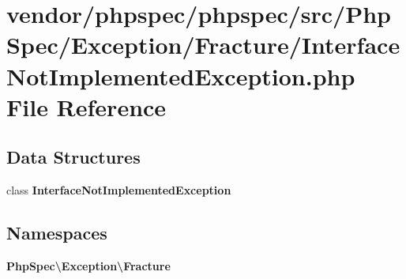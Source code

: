 \section{vendor/phpspec/phpspec/src/\+Php\+Spec/\+Exception/\+Fracture/\+Interface\+Not\+Implemented\+Exception.php File Reference}
\label{_interface_not_implemented_exception_8php}
\subsection*{Data Structures}
\begin{DoxyCompactItemize}
\item 
class {\bf Interface\+Not\+Implemented\+Exception}
\end{DoxyCompactItemize}
\subsection*{Namespaces}
\begin{DoxyCompactItemize}
\item 
 {\bf Php\+Spec\textbackslash{}\+Exception\textbackslash{}\+Fracture}
\end{DoxyCompactItemize}
